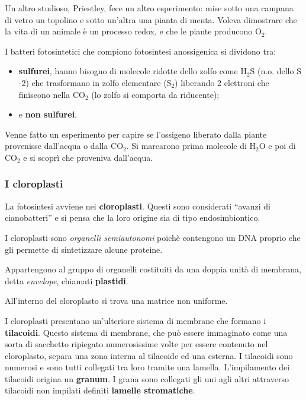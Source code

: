 \documentclass[]{article}
\begin{document}
Un altro studioso, Priestley, fece un altro esperimento: mise sotto una
campana di vetro un topolino e sotto un'altra una pianta di menta.
Voleva dimostrare che la vita di un animale è un processo redox, e che
le piante producono O$_2$.

I batteri fotosintetici che compiono fotosintesi anossigenica si dividono tra:

\begin{itemize}
\itemsep1pt\parskip0pt
\item
  \textbf{sulfurei}, hanno bisogno di molecole ridotte dello zolfo come
  H$_2$S (n.o. dello S -2) che trasformano in zolfo elementare (S$_2$)
  liberando 2 elettroni che finiscono nella CO$_2$ (lo zolfo si comporta
  da riducente);
\item
  e \textbf{non sulfurei}.
\end{itemize}

Venne fatto un esperimento per capire se l'ossigeno liberato dalla
piante provenisse dall'acqua o dalla CO$_2$. Si marcarono prima molecole
di H$_2$O e poi di CO$_2$ e si scoprì che proveniva dall'acqua.

\subsubsection{I cloroplasti}\label{i-cloroplasti}

La fotosintesi avviene nei \textbf{cloroplasti}. Questi sono considerati
``avanzi di cianobatteri'' e si pensa che la loro origine sia di tipo
endosimbiontico.

I cloroplasti sono \emph{organelli semiautonomi} poichè contengono un
DNA proprio che gli permette di sintetizzare alcune proteine.

Appartengono al gruppo di organelli costituiti da una doppia unità di
membrana, detta \emph{envelope}, chiamati \textbf{plastidi}.

All'interno del cloroplasto si trova una matrice non uniforme.

I cloroplasti presentano un'ulteriore sistema di membrane che formano i
\textbf{tilacoidi}. Questo sistema di membrane, che può essere
immaginato come una sorta di sacchetto ripiegato numerosissime volte per
essere contenuto nel cloroplasto, separa una zona interna al tilacoide
ed una esterna. I tilacoidi sono numerosi e sono tutti collegati tra
loro tramite una lamella. L'impilamento dei tilacoidi origina un
\textbf{granum}. I grana sono collegati gli uni agli altri attraverso
tilacoidi non impilati definiti \textbf{lamelle stromatiche}.
\end{document}
